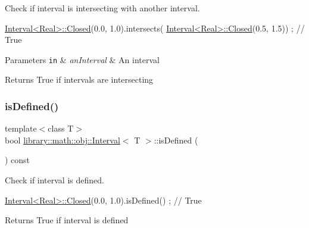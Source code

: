 Check if interval is intersecting with another interval. 


\begin{DoxyCode}
\hyperlink{classlibrary_1_1math_1_1obj_1_1_interval_aae8bb2b89af450729338d48563def4d7}{Interval<Real>::Closed}(0.0, 1.0).intersects(
      \hyperlink{classlibrary_1_1math_1_1obj_1_1_interval_aae8bb2b89af450729338d48563def4d7}{Interval<Real>::Closed}(0.5, 1.5)) ; \textcolor{comment}{// True}
\end{DoxyCode}



\begin{DoxyParams}[1]{Parameters}
\mbox{\tt in}  & {\em an\+Interval} & An interval \\
\hline
\end{DoxyParams}
\begin{DoxyReturn}{Returns}
True if intervals are intersecting 
\end{DoxyReturn}
\mbox{\label{classlibrary_1_1math_1_1obj_1_1_interval_a2de37bb9d7b97ae7892188c26c99b6fb}} 
\subsubsection{\texorpdfstring{is\+Defined()}{isDefined()}}
{\footnotesize\ttfamily template$<$class T$>$ \\
bool \hyperlink{classlibrary_1_1math_1_1obj_1_1_interval}{library\+::math\+::obj\+::\+Interval}$<$ T $>$\+::is\+Defined (\begin{DoxyParamCaption}{ }\end{DoxyParamCaption}) const}



Check if interval is defined. 


\begin{DoxyCode}
\hyperlink{classlibrary_1_1math_1_1obj_1_1_interval_aae8bb2b89af450729338d48563def4d7}{Interval<Real>::Closed}(0.0, 1.0).isDefined() ; \textcolor{comment}{// True}
\end{DoxyCode}


\begin{DoxyReturn}{Returns}
True if interval is defined 
\end{DoxyReturn}
\mbox{\label{classlibrary_1_1math_1_1obj_1_1_interval_a0e9997639f0c415f4f7fe8dcb58e13a8}} 
